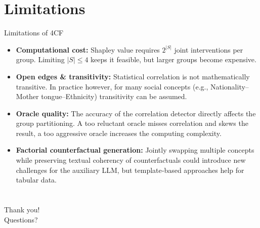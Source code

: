 \documentclass[aspectratio=169]{beamer}
\begin{document}
\section{Limitations}
\begin{frame}{Limitations of 4CF}
\begin{itemize}
  \item \textbf{Computational cost:} Shapley value requires $2^{|S|}$ joint interventions per group. Limiting $|S|\le 4$ keeps it feasible, but larger groups become expensive.
  \item \textbf{Open edges \& transitivity:} Statistical correlation is not mathematically transitive. In practice however, for many social concepts (e.g., Nationality–Mother tongue–Ethnicity) transitivity can be assumed.
  \item \textbf{Oracle quality:} The accuracy of the correlation detector directly affects the group partitioning. A too reluctant oracle misses correlation and skews the result, a too aggressive oracle increases the computing complexity.
  \item \textbf{Factorial counterfactual generation:} Jointly swapping multiple concepts while preserving textual coherency of counterfactuals could introduce new challenges for the auxiliary LLM, but template‑based approaches help for tabular data.
\end{itemize}
\end{frame}

\section*{}
\begin{frame}[allowframebreaks]
        \printbibliography
\end{frame}

\begin{frame}{}
\centering
\Large Thank you!\\
\bigskip
Questions?
\end{frame}
\end{document}
